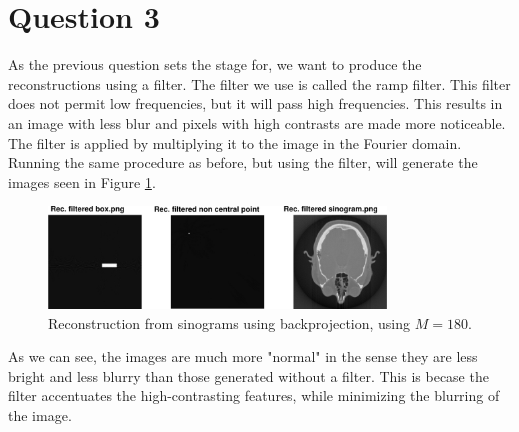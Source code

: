 \documentclass[a4paper]{article}
\begin{document}
\FloatBarrier

\section*{Question 3}
As the previous question sets the stage for, we want to produce the reconstructions using a filter. The filter we use is called the ramp filter. This filter does not permit low frequencies, but it will pass high frequencies. This results in an image with less blur and pixels with high contrasts are made more noticeable. The filter is applied by multiplying it to the image in the Fourier domain. Running the same procedure as before, but using the filter, will generate the images seen in Figure \ref{3}.
\begin{figure}[H]
  \centering
  \includegraphics[width=0.8\textwidth]{./3.pdf}
  \caption{Reconstruction from sinograms using backprojection, using $M=180$.}
  \label{3}
\end{figure}
As we can see, the images are much more "normal" in the sense they are less bright and less blurry than those generated without a filter. This is becase the filter accentuates the high-contrasting features, while minimizing the blurring of the image.

\FloatBarrier
\end{document}
